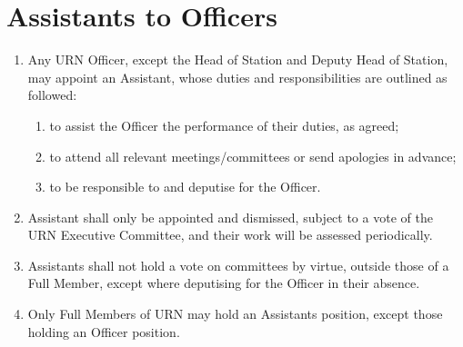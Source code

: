 \section{\label{scn:assistants} Assistants to Officers}

\begin{enumerate}[label*=\thesection.\arabic*.]
    \item Any URN Officer, except the Head of Station and Deputy Head of Station, may appoint an Assistant, whose duties and responsibilities are outlined as followed:
          \begin{enumerate}[label*=\arabic*.]
              \item to assist the Officer the performance of their duties, as agreed;
              \item to attend all relevant meetings/committees or send apologies in advance;
              \item to be responsible to and deputise for the Officer.
          \end{enumerate}
    \item Assistant shall only be appointed and dismissed, subject to a vote of the URN Executive Committee, and their work will be assessed periodically.
    \item Assistants shall not hold a vote on committees by virtue, outside those of a Full Member, except where deputising for the Officer in their absence.
    \item Only Full Members of URN may hold an Assistants position, except those holding an Officer position.
\end{enumerate}
